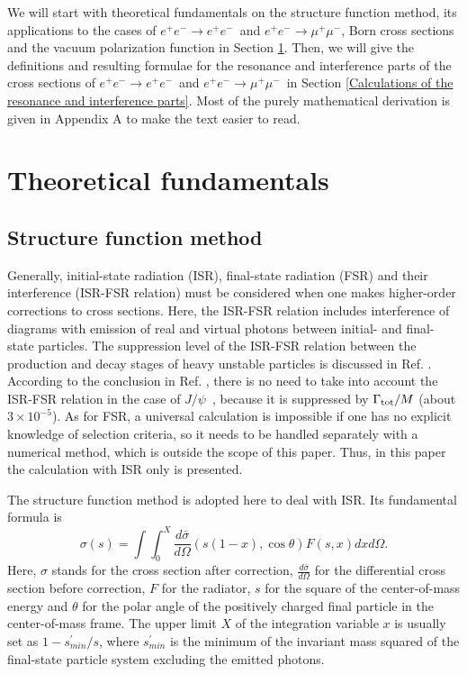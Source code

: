\documentclass[a4paper,10pt,twoside]{cpc-hepnp}
\newcommand{\jpsi}{$J/\psi$~}
\newcommand{\eetoee}{$e^+e^- \to e^+e^-$~}
\newcommand{\eetomumu}{$e^+e^- \to \mu^+\mu^-$~}
\newcommand{\eetomumuwos}{$e^+e^- \to \mu^+\mu^-$}
\begin{document}
\begin{CJK*}{UTF8}{gbsn}
\begin{multicols}{2}
We will start with theoretical fundamentals on the structure function method, its applications to the cases of \eetoee and \eetomumuwos, Born cross sections and the vacuum polarization function in Section \ref{Theoretical fundamentals}. Then, we will give the definitions and resulting formulae for the resonance and interference parts of the cross sections of \eetoee and \eetomumu in Section \ref{Calculations of the resonance and interference parts}. Most of the purely mathematical derivation is given in Appendix A to make the text easier to read.



\section{Theoretical fundamentals}
\label{Theoretical fundamentals}
%

\subsection{Structure function method}

Generally, initial-state radiation (ISR), final-state radiation (FSR) and their interference (ISR-FSR relation) must be considered when one makes higher-order corrections to cross sections. Here, the ISR-FSR relation includes interference of diagrams with emission of real and virtual photons between initial- and final-state particles. The suppression level of the ISR-FSR relation between the production and decay stages of heavy unstable particles is discussed in Ref. \cite{ISR-FSR relation}. According to the conclusion in Ref. \cite{ISR-FSR relation}, there is no need to take into account the ISR-FSR relation in the case of \jpsi, because it is suppressed by $\Gamma_{\rm tot}/M$ (about $3\times10^{-5}$). As for FSR, a universal calculation is impossible if one has no explicit knowledge of selection criteria, so it needs to be handled separately with a numerical method, which is outside the scope of this paper. Thus, in this paper the calculation with ISR only is presented.

The structure function method \cite{STRUCTUREFUNCTIONMETHOD} is adopted here to deal with ISR. Its fundamental formula is
\begin{equation}
	\sigma(s) = \int \int_0^X \frac{d\bar{\sigma}}{d\Omega}(s(1-x),\cos\theta) F(s,x) dx d\Omega.
	\label{Equation: Fundamental formula of structure function method}
\end{equation}
Here, $\sigma$ stands for the cross section after correction, $\frac{d\bar{\sigma}}{d\Omega}$ for the differential cross section before correction, $F$ for the radiator, $s$ for the square of the center-of-mass energy and $\theta$ for the polar angle of the positively charged final particle in the center-of-mass frame. The upper limit $X$ of the integration variable $x$ is usually set as $1-s^{\prime}_{min}/s$, where $s^{\prime}_{min}$ is the minimum of the invariant mass squared of the final-state particle system excluding the emitted photons.


\end{multicols}
\end{CJK*}
\end{document}

